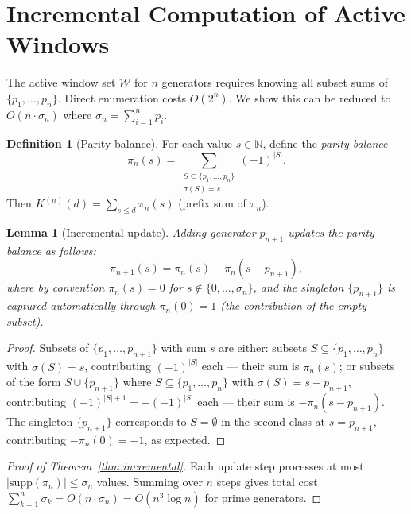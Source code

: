 \documentclass[11pt,a4paper]{amsart}
\theoremstyle{plain}
\newtheorem{lemma}[theorem]{Lemma}
\theoremstyle{definition}
\newtheorem{definition}[theorem]{Definition}
\theoremstyle{remark}
\begin{document}
\section{Incremental Computation of Active Windows}
\label{sec:incremental}

The active window set $\mathcal{W}$ for $n$ generators requires
knowing all subset sums of $\{p_1,\ldots,p_n\}$.
Direct enumeration costs $O(2^n)$.
We show this can be reduced to $O(n \cdot \sigma_n)$ where
$\sigma_n = \sum_{i=1}^n p_i$.

\begin{definition}[Parity balance]
\label{def:parity}
For each value $s \in \mathbb{N}$, define the \emph{parity balance}
\[
  \pi_n(s) = \sum_{\substack{S \subseteq \{p_1,\ldots,p_n\} \\ \sigma(S) = s}}
             (-1)^{|S|}.
\]
Then $K^{(n)}(d) = \sum_{s \leq d} \pi_n(s)$ (prefix sum of $\pi_n$).
\end{definition}

\begin{lemma}[Incremental update]
\label{lem:incremental}
Adding generator $p_{n+1}$ updates the parity balance as follows:
\[
  \pi_{n+1}(s) = \pi_n(s) - \pi_n(s - p_{n+1}),
\]
where by convention $\pi_n(s) = 0$ for $s \notin \{0,\ldots,\sigma_n\}$,
and the singleton $\{p_{n+1}\}$ is captured automatically through
$\pi_n(0) = 1$ (the contribution of the empty subset).
\end{lemma}

\begin{proof}
Subsets of $\{p_1,\ldots,p_{n+1}\}$ with sum $s$ are either:
subsets $S \subseteq \{p_1,\ldots,p_n\}$ with $\sigma(S) = s$, contributing
$(-1)^{|S|}$ each --- their sum is $\pi_n(s)$;
or subsets of the form $S \cup \{p_{n+1}\}$ where $S \subseteq \{p_1,\ldots,p_n\}$
with $\sigma(S) = s - p_{n+1}$, contributing $(-1)^{|S|+1} = -(-1)^{|S|}$ each ---
their sum is $-\pi_n(s - p_{n+1})$.
The singleton $\{p_{n+1}\}$ corresponds to $S = \emptyset$ in the second class
at $s = p_{n+1}$, contributing $-\pi_n(0) = -1$, as expected.
\end{proof}

\begin{proof}[Proof of Theorem~\ref{thm:incremental}]
Each update step processes at most $|\mathrm{supp}(\pi_n)| \leq \sigma_n$
values. Summing over $n$ steps gives total cost $\sum_{k=1}^n \sigma_k
= O(n \cdot \sigma_n) = O(n^3 \log n)$ for prime generators.
\end{proof}
\end{document}
